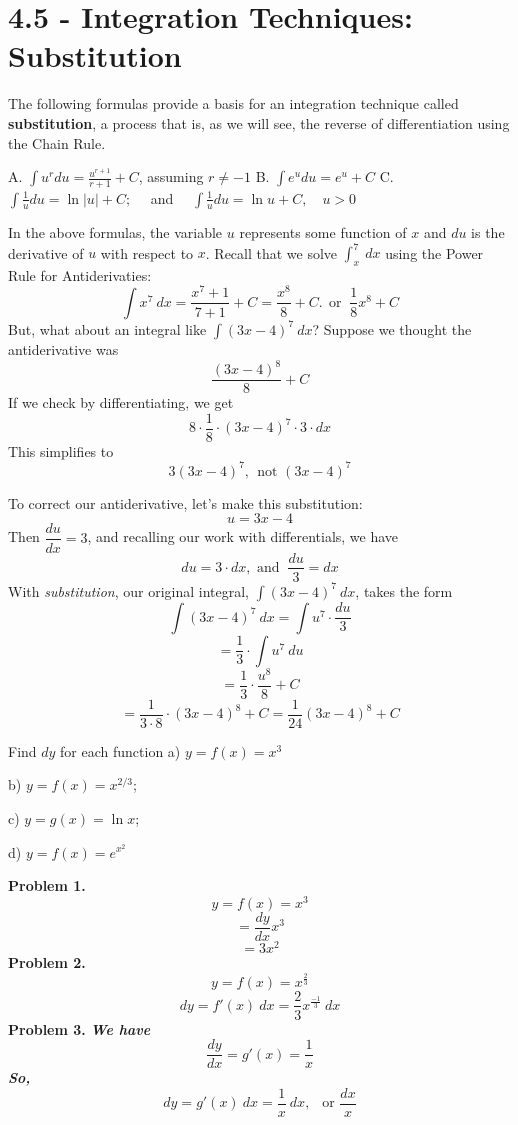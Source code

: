 \documentclass{report}
\begin{document}
\section*{4.5 - Integration Techniques: Substitution}
The following formulas provide a basis for an integration technique called \textbf{substitution}, a process that is, as we will see, the reverse of differentiation using the Chain Rule.
\bigbreak \noindent
\begin{mdframed}
A. $\int u^r d u=\frac{u^{r+1}}{r+1}+C$, assuming $r \neq-1$
\bigbreak \noindent
B. $\int e^u d u=e^u+C$
\bigbreak \noindent
C. $\int \frac{1}{u} d u=\ln |u|+C ; \quad$ and $\quad \int \frac{1}{u} d u=\ln u+C, \quad u>0$
\end{mdframed}
\bigbreak \noindent
In the above formulas, the variable $u$ represents some function of $x$ and $du$ is the derivative of $u$ with respect to $x$. Recall that we solve $\int_x^7\ dx$ using the Power Rule for Antiderivaties:
$$ \int{x^7}\ dx = \dfrac{x^7+1}{7+1} +C = \dfrac{x^8}{8}+C. \ \ \text{or } \ \dfrac{1}{8}x^8 +C$$
But, what about an integral like $\int(3x-4)^7\ dx$? Suppose we thought the antiderivative was
$$ \dfrac{(3x-4)^8}{8}+C$$
If we check by differentiating, we get
$$ 8\cdot\dfrac{1}{8}\cdot(3x-4)^7\cdot3\cdot dx$$
This simplifies to
$$ 3(3x-4)^7, \ \ \text{not } (3x-4)^7$$

\pagebreak
\noindent
To correct our antiderivative, let's make this substitution:
$$ u = 3x-4$$
Then $ \dfrac{du}{dx} = 3$, and recalling our work with differentials, we have
$$ du = 3 \cdot dx, \text{ and } \ \dfrac{du}{3} = dx$$
With \textit{substitution}, our original integral, $\int(3x-4)^7\ dx$, takes the form
$$ \int(3x-4)^7\ dx = \int{u^7} \cdot \dfrac{du}{3}$$
$$ = \dfrac{1}{3} \cdot \int{u^7}\ du$$
$$ = \dfrac{1}{3} \cdot\dfrac{u^8}{8} + C$$
$$ = \dfrac{1}{3\cdot 8}\cdot (3x-4)^8 +C = \dfrac{1}{24}(3x-4)^8+C$$
\begin{mdframed}
\q
Find $dy$ for each function
\bigbreak \noindent
a) $y=f(x)=x^3$
\vspace{2mm}\noindent

\noindent
b) $y=f(x)=x^{2 / 3}$;
\vspace{2mm}\noindent

\noindent
c) $y=g(x)=\ln x$;
\vspace{2mm}\noindent

\noindent 
d) $y=f(x)=e^{x^2}$
\vspace{1mm}
\end{mdframed}
\bigbreak \noindent
\textbf{Problem 1.}
$$ y=f(x) = x^3$$
$$ = \dfrac{dy}{dx}x^3$$
$$ = 3x^2$$
\bigbreak \noindent
\textbf{Problem 2.}
$$ y = f(x) = x^{\frac{2}{3}}$$
$$ dy = f'(x)\ dx = \dfrac{2}{3}x^{\frac{-1}{3}}\ dx$$
\bigbreak \noindent
\textbf{Problem 3.}
\bigbreak \noindent
\textit{\textbf{We have}}
$$ \dfrac{dy}{dx} = g'(x) = \dfrac{1}{x}$$
\textit{\textbf{So,}}
$$ dy = g'(x)\ dx = \dfrac{1}{x}\ dx, \ \ \text{ or } \dfrac{dx}{x}$$
\end{document}
